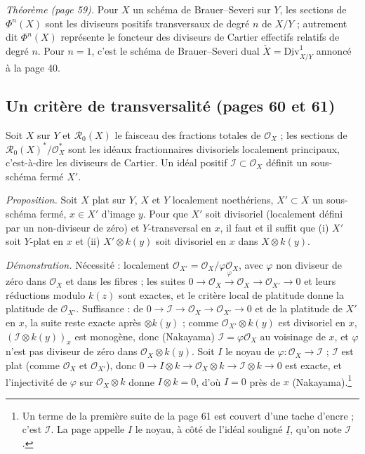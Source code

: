 \documentclass[11pt,a4paper]{article}
\begin{document}
\emph{Théorème (page 59).} Pour $X$ un schéma de Brauer–Severi sur $Y$, les
sections de $\Phi^{n}(X)$ sont les diviseurs positifs transversaux de degré
$n$ de $X/Y$ ; autrement dit $\Phi^{n}(X)$ représente le foncteur des
diviseurs de Cartier effectifs relatifs de degré $n$. Pour $n = 1$, c'est le
schéma de Brauer–Severi dual $\check{X} = \underline{\mathrm{Div}}^{1}_{X/Y}$
annoncé à la page 40.

\subsection*{Un critère de transversalité (pages 60 et 61)}

Soit $X$ sur $Y$ et $\mathcal{R}_0(X)$ le faisceau des fractions totales de
$\mathcal{O}_X$ ; les sections de $\mathcal{R}_0(X)^{*}/\mathcal{O}_X^{*}$
sont les idéaux fractionnaires divisoriels localement principaux, c'est-à-dire
les diviseurs de Cartier. Un idéal positif $\mathcal{I} \subset \mathcal{O}_X$
définit un sous-schéma fermé $X'$.

\emph{Proposition.} Soit $X$ plat sur $Y$, $X$ et $Y$ localement noethériens,
$X' \subset X$ un sous-schéma fermé, $x \in X'$ d'image $y$. Pour que $X'$ soit
divisoriel (localement défini par un non-diviseur de zéro) et $Y$-transversal
en $x$, il faut et il suffit que (i) $X'$ soit $Y$-plat en $x$ et (ii) $X'
\otimes k(y)$ soit divisoriel en $x$ dans $X \otimes k(y)$.

\emph{Démonstration.} Nécessité : localement $\mathcal{O}_{X'} =
\mathcal{O}_X/\varphi\mathcal{O}_X$, avec $\varphi$ non diviseur de zéro dans
$\mathcal{O}_X$ et dans les fibres ; les suites $0 \to \mathcal{O}_X
\xrightarrow{\varphi} \mathcal{O}_X \to \mathcal{O}_{X'} \to 0$ et leurs
réductions modulo $k(z)$ sont exactes, et le critère local de platitude donne
la platitude de $\mathcal{O}_{X'}$. Suffisance : de $0 \to \mathcal{I} \to
\mathcal{O}_X \to \mathcal{O}_{X'} \to 0$ et de la platitude de $X'$ en $x$, la
suite reste exacte après $\otimes k(y)$ ; comme $\mathcal{O}_{X'} \otimes
k(y)$ est divisoriel en $x$, $(\mathcal{I} \otimes k(y))_x$ est monogène, donc
(Nakayama) $\mathcal{I} = \varphi\mathcal{O}_X$ au voisinage de $x$, et $\varphi$
n'est pas diviseur de zéro dans $\mathcal{O}_X \otimes k(y)$. Soit $I$ le
noyau de $\varphi : \mathcal{O}_X \to \mathcal{I}$ ; $\mathcal{I}$ est plat
(comme $\mathcal{O}_X$ et $\mathcal{O}_{X'}$), donc $0 \to I \otimes k \to
\mathcal{O}_X \otimes k \to \mathcal{I} \otimes k \to 0$ est exacte, et
l'injectivité de $\varphi$ sur $\mathcal{O}_X \otimes k$ donne $I \otimes k =
0$, d'où $I = 0$ près de $x$ (Nakayama).\footnote{Un terme de la première suite
de la page 61 est couvert d'une tache d'encre ; c'est $\mathcal{I}$. La page
appelle $I$ le noyau, à côté de l'idéal souligné $\underline{I}$, qu'on note
$\mathcal{I}$.}
\end{document}

